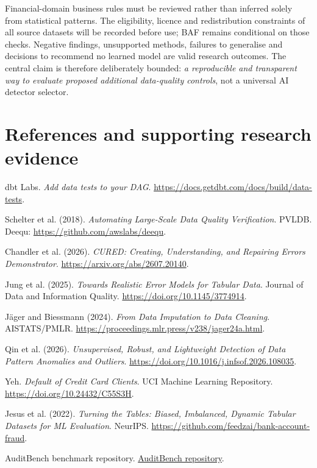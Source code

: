 \documentclass[10pt,a4paper]{article}
\begin{document}
Financial-domain business rules must be reviewed rather than inferred solely from statistical patterns. The eligibility, licence and redistribution constraints of all source datasets will be recorded before use; BAF remains conditional on those checks. Negative findings, unsupported methods, failures to generalise and decisions to recommend no learned model are valid research outcomes. The central claim is therefore deliberately bounded: \emph{a reproducible and transparent way to evaluate proposed additional data-quality controls}, not a universal AI detector selector.

\section*{References and supporting research evidence}
\begingroup\small
\setlength{\parskip}{3pt}
\noindent [1] dbt Labs. \emph{Add data tests to your DAG}. \url{https://docs.getdbt.com/docs/build/data-tests}.\par
\noindent [2] Schelter et al. (2018). \emph{Automating Large-Scale Data Quality Verification}. PVLDB. Deequ: \url{https://github.com/awslabs/deequ}.\par
\noindent [3] Chandler et al. (2026). \emph{CURED: Creating, Understanding, and Repairing Errors Demonstrator}. \url{https://arxiv.org/abs/2607.20140}.\par
\noindent [4] Jung et al. (2025). \emph{Towards Realistic Error Models for Tabular Data}. Journal of Data and Information Quality. \url{https://doi.org/10.1145/3774914}.\par
\noindent [5] J\"ager and Biessmann (2024). \emph{From Data Imputation to Data Cleaning}. AISTATS/PMLR. \url{https://proceedings.mlr.press/v238/jager24a.html}.\par
\noindent [6] Qin et al. (2026). \emph{Unsupervised, Robust, and Lightweight Detection of Data Pattern Anomalies and Outliers}. \url{https://doi.org/10.1016/j.infsof.2026.108035}.\par
\noindent [7] Yeh. \emph{Default of Credit Card Clients}. UCI Machine Learning Repository. \url{https://doi.org/10.24432/C55S3H}.\par
\noindent [8] Jesus et al. (2022). \emph{Turning the Tables: Biased, Imbalanced, Dynamic Tabular Datasets for ML Evaluation}. NeurIPS. \url{https://github.com/feedzai/bank-account-fraud}.\par
\noindent [9] AuditBench benchmark repository. \href{https://github.com/Oppugno-Rushi/AuditBench-Benchmarking-LLMs-for-Financial-Auditing}{AuditBench repository}.\par
\end{document}
